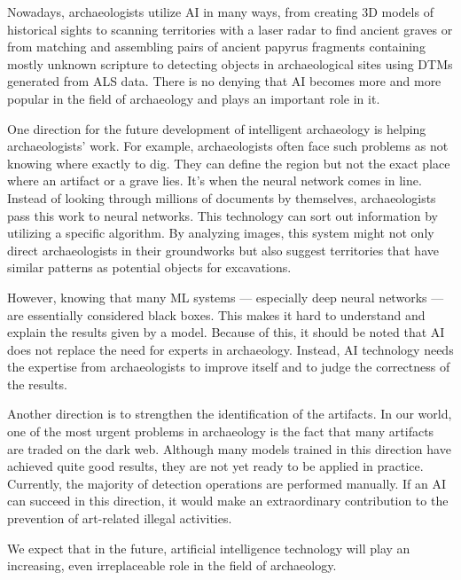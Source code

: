 \documentclass[journal]{IEEEtran}
\begin{document}
	Nowadays, archaeologists utilize AI in many ways, from creating 3D models of historical sights
	to scanning territories with a laser radar to find ancient graves or from matching and
	assembling pairs of ancient papyrus fragments containing mostly unknown scripture to detecting
	objects in archaeological sites using DTMs generated from ALS data. There is no denying that 
	AI becomes more and more popular in the field of archaeology and plays an important role in it.

	One direction for the future development of intelligent archaeology is helping archaeologists' work.
	For example, archaeologists often face such problems as not knowing where exactly to dig. 
	They can define the region but not the exact place where an artifact or a grave lies. 
	It's when the neural network comes in line. Instead of looking through millions of documents by themselves, 
	archaeologists pass this work to neural networks. This technology can sort out information by utilizing a 
	specific algorithm. By analyzing images, this system might not only direct archaeologists in their 
	groundworks but also suggest territories that have similar patterns as potential objects for excavations.

	However, knowing that many ML systems --- especially deep neural networks --- are essentially considered black boxes.
	This makes it hard to understand and explain the results given by a model. Because of this, it should be noted that AI does not 
	replace the need for experts in archaeology. Instead, AI technology needs the expertise from archaeologists to improve itself and 
	to judge the correctness of the results.

	Another direction is to strengthen the identification of the artifacts.
	In our world, one of the most urgent problems in archaeology is the fact that
	many artifacts are traded on the dark web. Although 
	many models trained in this direction have achieved 
	quite good results, they are not yet ready to be 
	applied in practice. Currently, the majority of 
	detection operations are performed manually.
	If an AI can succeed in this direction, it would 
	make an extraordinary contribution to the prevention of 
	art-related illegal activities.

	We expect that in the future, artificial intelligence technology will play an increasing, even irreplaceable role in the field of archaeology.
	
\end{document}
